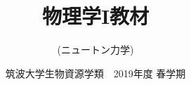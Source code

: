 \documentclass[twocolumn,9.5pt,fleqn,dvipdfmx]{jsbook}
\begin{document}
\title {{\Huge 物理学I教材}\\ }
\author{{\Large (ニュートン力学)}\\ }
\date{{\Large 筑波大学生物資源学類　2019年度 春学期}}
\maketitle
\newpage
\frontmatter

\tableofcontents
\mainmatter














\printindex
\end{document}
